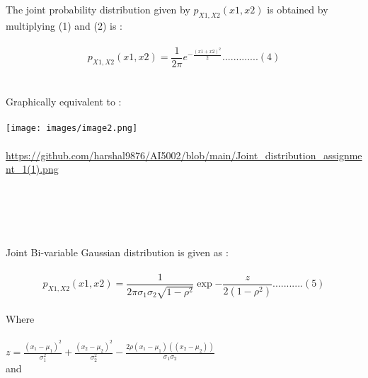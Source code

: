 \documentclass{article}
\begin{document}
 The joint probability distribution given by $p_{X1,X2}(x1,x2)$ is obtained by multiplying (1) and (2) is :\\
 \\
 $$p_{X1,X2}(x1,x2) ={\frac {1}{ {{2\pi }}}}e^{-{\frac {(x1 + x2)^2}{2}}}.............(4)$$\\
 \\
 Graphically equivalent to :\\
 \\
\texttt{[image: images/image2.png]}\\
\\
\url{https://github.com/harshal9876/AI5002/blob/main/Joint_distribution_assignment_1(1).png}\\
\\
\\
\\
\\
\\
Joint Bi-variable Gaussian distribution is given as :\\
\\
 $$p_{X1,X2}(x1,x2) = \frac{1}{2\pi\sigma_{1}\sigma_{2}\sqrt{1-\rho^2}}\exp{-\frac{z}{2(1-\rho^2)}}...........(5)$$\\
 Where \\
 \\
 $z = \frac{(x_{1}-\mu_{1})^2}{\sigma_{1}^2}+\frac{(x_{2}-\mu_{2})^2}{\sigma_{2}^2} -\frac{2\rho(x_{1}-\mu_{1})((x_{2}-\mu_{2}))}{\sigma_{1}\sigma_{2}} $\\
 and \\
 
\end{document}
